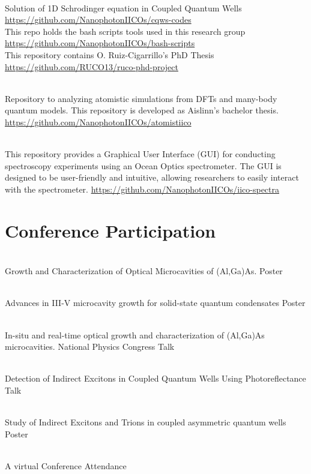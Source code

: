 \documentclass[letterpaper,dvipsnames]{twentysecondcv} %
\begin{document}
\begin{twenty} %
	{\\Solution of 1D Schrodinger equation in Coupled Quantum Wells}
	{\url{https://github.com/NanophotonIICOs/cqws-codes}}
	{\\This repo holds the bash scripts tools used in this research group}
	{\url{https://github.com/NanophotonIICOs/bash-scripts}}
	{\\This repository contains O. Ruiz-Cigarrillo's PhD Thesis	}
	{\url{https://github.com/RUCO13/ruco-phd-project}}

	{\\Repository to analyzing atomistic simulations from DFTs and many-body quantum models. This repository is developed as Aislinn's bachelor thesis.	}
	{\url{https://github.com/NanophotonIICOs/atomistiico}}

	{\\This repository provides a Graphical User Interface (GUI) for conducting spectroscopy experiments using an Ocean Optics spectrometer. The GUI is designed to be user-friendly and intuitive, allowing researchers to easily interact with the spectrometer.}
	{\url{https://github.com/NanophotonIICOs/iico-spectra}}
\end{twenty}

\newpage
\makeprofile 
\section{Conference Participation}

\begin{twenty} %
	                 {\\Growth and Characterization of Optical Microcavities of (Al,Ga)As.}
                     {Poster}
                     
   {\\ Advances in III-V microcavity growth for solid-state quantum condensates}
   {Poster}
  
	{\\ In-situ and real-time optical growth and characterization of (Al,Ga)As microcavities.
		National Physics Congress
	}
	{Talk}
	
	{\\ Detection of Indirect Excitons in Coupled Quantum Wells Using Photoreflectance}
	{Talk}
	
	{\\Study of Indirect Excitons and Trions in coupled asymmetric quantum wells}
	{Poster}


	{\\A virtual Conference }
	{Attendance}
\end{twenty}
\end{document}
